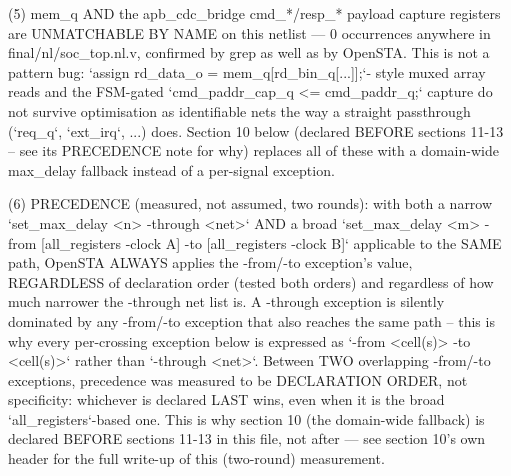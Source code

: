\begin{record}
\begin{textblock}
  (5) mem_q AND the apb_cdc_bridge cmd_*/resp_* payload capture registers
      are UNMATCHABLE BY NAME on this netlist — 0 occurrences anywhere in
      final/nl/soc_top.nl.v, confirmed by grep as well as by OpenSTA. This
      is not a pattern bug: `assign rd_data_o = mem_q[rd_bin_q[...]];`-
      style muxed array reads and the FSM-gated `cmd_paddr_cap_q <=
      cmd_paddr_q;` capture do not survive optimisation as identifiable
      nets the way a straight passthrough (`req_q`, `ext_irq`, ...)
      does. Section 10 below (declared BEFORE sections 11-13 -- see its
      PRECEDENCE note for why) replaces all of these with a domain-wide
      max_delay fallback instead of a per-signal exception.

  (6) PRECEDENCE (measured, not assumed, two rounds): with both a narrow
      `set_max_delay <n> -through <net>` AND a broad
      `set_max_delay <m> -from [all_registers -clock A] -to
      [all_registers -clock B]` applicable to the SAME path, OpenSTA
      ALWAYS applies the -from/-to exception's value, REGARDLESS of
      declaration order (tested both orders) and regardless of how much
      narrower the -through net list is. A -through exception is
      silently dominated by any -from/-to exception that also reaches the
      same path -- this is why every per-crossing exception below is
      expressed as `-from <cell(s)> -to <cell(s)>` rather than `-through
      <net>`.
      Between TWO overlapping -from/-to exceptions, precedence was
      measured to be DECLARATION ORDER, not specificity: whichever is
      declared LAST wins, even when it is the broad `all_registers`-based
      one. This is why section 10 (the domain-wide fallback) is declared
      BEFORE sections 11-13 in this file, not after — see section 10's
      own header for the full write-up of this (two-round) measurement.


\end{textblock}
\end{record}

